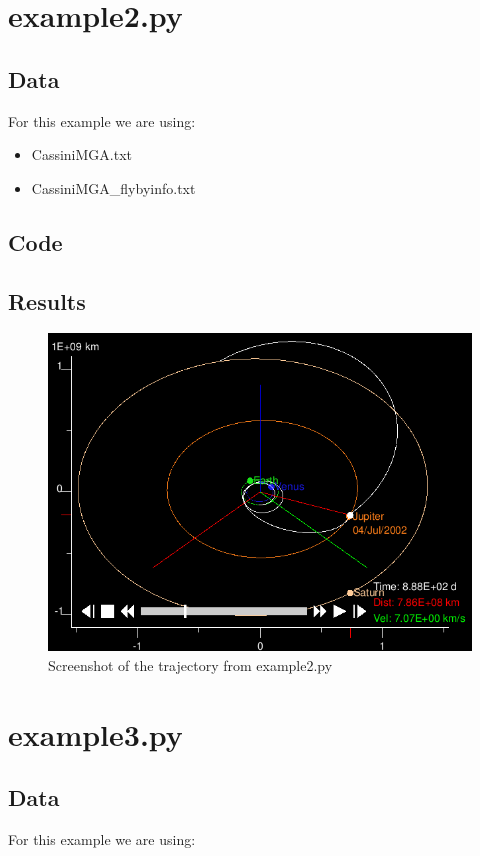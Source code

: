 \documentclass[a4paper,11pt]{article}
\begin{document}
\section{example2.py}
\subsection{Data}
For this example we are using:

\begin{itemize}
\item CassiniMGA.txt
\item CassiniMGA\_flybyinfo.txt
\end{itemize}
\subsection{Code}

\subsection{Results}
\begin{figure}[h!]
\centering
\includegraphics[width=1\textwidth]{img/example2}
\caption{Screenshot of the trajectory from example2.py}
\label{img:example2}
\end{figure}


\section{example3.py}
\subsection{Data}
For this example we are using:
\end{document}
